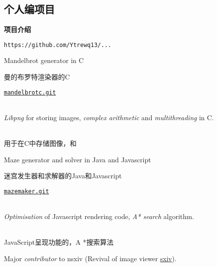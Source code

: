 \documentclass[cv_en.tex]{subfiles}
\begin{document}
\begin{xcn}
    \subsection{个人编项目} %
        \hspace{1em} \textbf{项目介绍} %
\end{xcn}
        \hfill
        \texttt{https://github.com/Ytrewq13/...}
        \begin{itemize}
\begin{xen}
            \item Mandelbrot generator in C
\end{xen}
\begin{xcn}
            \item 曼的布罗特渲染器的C
\end{xcn}
                \hfill
                \href{https://github.com/Ytrewq13/mandelbrotc.git}{\texttt{mandelbrotc.git}}
\begin{xen}
    \\ \emph{Libpng} for storing images, \emph{complex arithmetic} and
    \emph{multithreading} in C.
\end{xen}
\begin{xcn}
    \\ 用于在C中存储图像，和
\end{xcn}
\begin{xen}
            \item Maze generator and solver in Java and Javascript
\end{xen}
\begin{xcn}
            \item 迷宫发生器和求解器的Java和Javascript
\end{xcn}
                \hfill
                \href{https://github.com/Ytrewq13/mazemaker.git}{\texttt{mazemaker.git}}
\begin{xen}
    \\ \emph{Optimisation} of Javascript rendering code, \emph{A* search}
    algorithm.
\end{xen}
\begin{xcn}
    \\ JavaScript呈现功能的，A *搜索算法
\end{xcn}
\begin{xen}
            \item Major \emph{contributor} to nsxiv (Revival of image viewer \href{https://github.com/muennich/sxiv}{sxiv}).

\end{xen}
\end{itemize}
\end{document}
